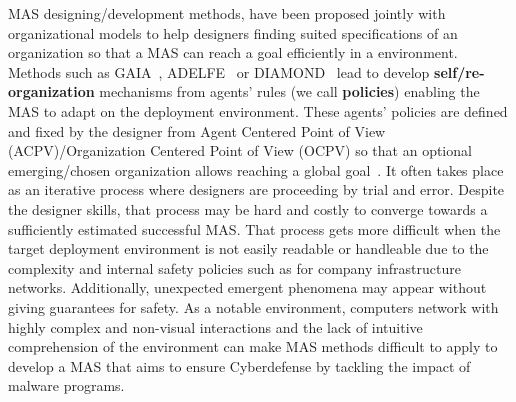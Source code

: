 \documentclass[runningheads]{llncs}
\begin{document}

MAS designing/development methods, have been proposed jointly with organizational models to help designers finding suited specifications of an organization so that a MAS can reach a goal efficiently in a environment. Methods such as GAIA~\cite{Wooldridge2000}, ADELFE~\cite{Bernon2003} or DIAMOND~\cite{Jamont2005} lead to develop \textbf{self/re-organization} mechanisms from agents' rules (we call \textbf{policies}) enabling the MAS to adapt on the deployment environment.
These agents' policies are defined and fixed by the designer from Agent Centered Point of View (ACPV)/Organization Centered Point of View (OCPV) so that an optional emerging/chosen organization allows reaching a global goal~\cite{Picard2009}. It often takes place as an iterative process where designers are proceeding by trial and error. Despite the designer skills, that process may be hard and costly to converge towards a sufficiently estimated successful MAS. That process gets more difficult when the target deployment environment is not easily readable or handleable due to the complexity and internal safety policies such as for company infrastructure networks. Additionally, unexpected emergent phenomena may appear without giving guarantees for safety. As a notable environment, computers network with highly complex and non-visual interactions and the lack of intuitive comprehension of the environment can make MAS methods difficult to apply to develop a MAS that aims to ensure Cyberdefense by tackling the impact of malware programs.

\end{document}
